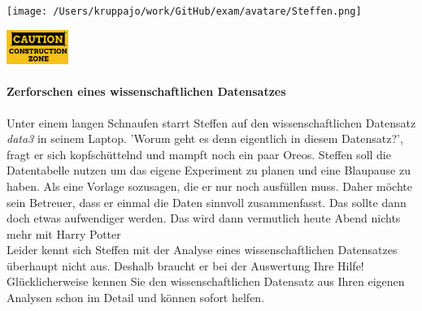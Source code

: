 \documentclass[a4paper, 9pt]{scrartcl}\usepackage[]{graphicx}\usepackage[]{xcolor}
\begin{document}
 
\begin{minipage}[t]{0.5\textwidth}
\texttt{[image: /Users/kruppajo/work/GitHub/exam/avatare/Steffen.png]}
\end{minipage}
\begin{minipage}[t]{0.5\textwidth}
\hfill
\href{https://youtu.be/C9skfFRTHhI}{\includegraphics[width = 2cm]{img/caution}}
\end{minipage}



\paragraph{Zerforschen eines wissenschaftlichen Datensatzes}

Unter einem langen Schnaufen starrt Steffen auf den wissenschaftlichen Datensatz \textit{data3} in seinem Laptop. 'Worum geht es denn eigentlich in diesem Datensatz?', fragt er sich kopfschüttelnd und mampft noch ein paar Oreos. Steffen soll die Datentabelle nutzen um das eigene Experiment zu planen und eine Blaupause zu haben. Als eine Vorlage sozusagen, die er nur noch ausfüllen muss. Daher möchte sein Betreuer, dass er einmal die Daten sinnvoll zusammenfasst. Das sollte dann doch etwas aufwendiger werden. Das wird dann vermutlich heute Abend nichts mehr mit Harry Potter\\

Leider kennt sich Steffen mit der Analyse eines wissenschaftlichen Datensatzes überhaupt nicht aus. Deshalb braucht er bei der Auswertung Ihre Hilfe! Glücklicherweise kennen Sie den wissenschaftlichen Datensatz aus Ihren eigenen Analysen schon im Detail und können sofort helfen.
\end{document}
